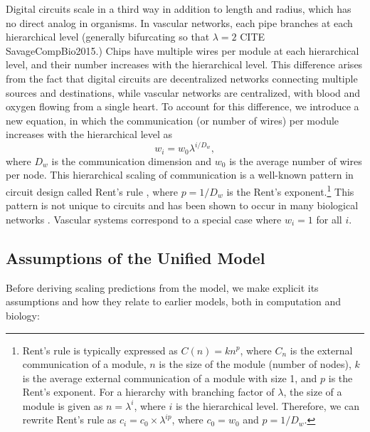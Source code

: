 \documentclass[12pt]{article}
\begin{document}
Digital circuits scale in a third way in addition to length and
radius, which has no direct 
analog in organisms. In vascular networks, each pipe 
branches at each hierarchical level (generally bifurcating so that $\lambda = 2$ CITE SavageCompBio2015.) Chips have multiple wires per module at each hierarchical level, and their number 
increases with the hierarchical level. This difference arises from the 
fact that digital circuits are decentralized networks connecting 
multiple sources and destinations, while vascular networks are 
centralized, with blood and oxygen flowing from a single heart. To account for 
this difference, we introduce a new equation, in which the 
communication (or number of wires) per module increases with the 
hierarchical level as
\begin{equation}
w_i = w_0 \lambda^{i/D_w},
\label{eq:communication}
\end{equation}
where $D_w$ is the communication dimension and $w_0$ is the average 
number of wires per node.  This hierarchical scaling of communication 
is a well-known pattern in circuit design called Rent's rule 
\cite{christie00}, where $p = 1/D_w$ is the Rent's
exponent.\footnote{Rent's rule is typically expressed as $C(n) = kn^p$, where $C_n$
  is the external communication of a module, $n$ is the size of the
  module (number of nodes), $k$ is the average external communication
  of a module with size 1, and $p$ is the Rent's exponent. For a
  hierarchy with branching factor of $\lambda$, the size of a module is
  given as $n = \lambda^i$, where $i$ is the hierarchical
  level. Therefore, we can rewrite Rent’s rule as $c_i = c_0
  \times \lambda^{ip}$, where $c_0 = w_0$ and $p = 1 / D_w$.} This 
pattern is not unique to circuits and has been shown to occur in many 
biological networks \cite{reda09,bassett10}.   Vascular systems 
correspond to a special case where 
$w_i = 1$ for all $i$. 

\subsection{Assumptions of the Unified Model}
\label{assumptions}

Before deriving scaling predictions from the model, we make explicit
its  assumptions and how they relate to earlier models, both in
computation and biology:
\end{document}
